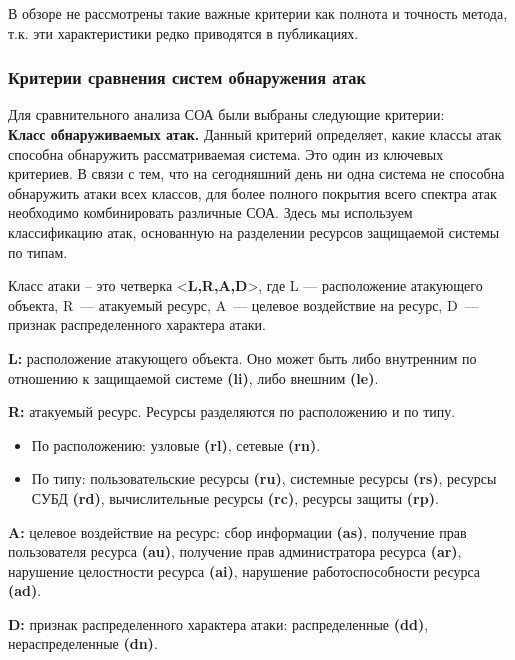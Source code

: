 В обзоре не рассмотрены такие важные критерии как полнота и точность метода, т.к. эти характеристики редко приводятся в публикациях.

\subsubsection{Критерии сравнения систем обнаружения атак}

Для сравнительного анализа СОА были выбраны следующие критерии:\\
\textbf{Класс обнаруживаемых атак.} Данный критерий определяет, какие классы атак способна обнаружить рассматриваемая система. Это один из ключевых критериев. В связи с тем, что на сегодняшний день ни одна система не способна обнаружить атаки всех классов, для более полного покрытия всего спектра атак необходимо комбинировать различные СОА. Здесь мы используем классификацию атак, основанную на разделении ресурсов защищаемой системы по типам.

Класс атаки – это четверка <\textbf{L,R,A,D}>, где L --- расположение атакующего объекта, R~--- атакуемый ресурс, A~--- целевое воздействие на ресурс, D~--- признак распределенного характера атаки.

\textbf{L:} расположение атакующего объекта. Оно может быть либо внутренним по отношению к защищаемой системе \textbf{(li)}, либо внешним \textbf{(le)}.

\textbf{R:} атакуемый ресурс. Ресурсы разделяются по расположению и по типу.

\begin{itemize}

\item По расположению: узловые \textbf{(rl)}, сетевые \textbf{(rn)}.

\item По типу: пользовательские ресурсы \textbf{(ru)}, системные ресурсы \textbf{(rs)}, ресурсы СУБД \textbf{(rd)}, вычислительные ресурсы \textbf{(rc)}, ресурсы защиты \textbf{(rp)}.

\end{itemize}

\textbf{A:} целевое воздействие на ресурс: сбор информации \textbf{(as)}, получение прав пользователя ресурса \textbf{(au)}, получение прав администратора ресурса \textbf{(ar)}, нарушение целостности ресурса \textbf{(ai)}, нарушение работоспособности ресурса \textbf{(ad)}.

\textbf{D:} признак распределенного характера атаки: распределенные \textbf{(dd)}, нераспределенные \textbf{(dn)}.

